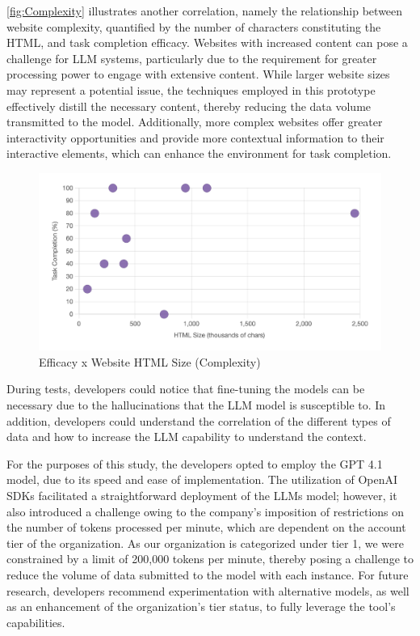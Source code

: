\documentclass[conference]{IEEEtran}
\begin{document}
\autoref{fig:Complexity} illustrates another correlation, namely the relationship between website complexity, quantified by the number of characters constituting the HTML, and task completion efficacy. Websites with increased content can pose a challenge for LLM systems, particularly due to the requirement for greater processing power to engage with extensive content. While larger website sizes may represent a potential issue, the techniques employed in this prototype effectively distill the necessary content, thereby reducing the data volume transmitted to the model. Additionally, more complex websites offer greater interactivity opportunities and provide more contextual information to their interactive elements, which can enhance the environment for task completion.
\begin{figure}[h]
    \centering
    \includegraphics[width=1\linewidth]{images/efficiencexcomplexity.png}
    \caption{Efficacy x Website HTML Size (Complexity)}
    \label{fig:Complexity}
\end{figure}

During tests, developers could notice that fine-tuning the models can be necessary due to the hallucinations that the LLM model is susceptible to. In addition, developers could understand the correlation of the different types of data and how to increase the LLM capability to understand the context. 

For the purposes of this study, the developers opted to employ the GPT 4.1 model, due to its speed and ease of implementation. The utilization of OpenAI SDKs facilitated a straightforward deployment of the LLMs model; however, it also introduced a challenge owing to the company's imposition of restrictions on the number of tokens processed per minute, which are dependent on the account tier of the organization. As our organization is categorized under tier 1, we were constrained by a limit of 200,000 tokens per minute, thereby posing a challenge to reduce the volume of data submitted to the model with each instance. For future research, developers recommend experimentation with alternative models, as well as an enhancement of the organization's tier status, to fully leverage the tool's capabilities.
\end{document}
